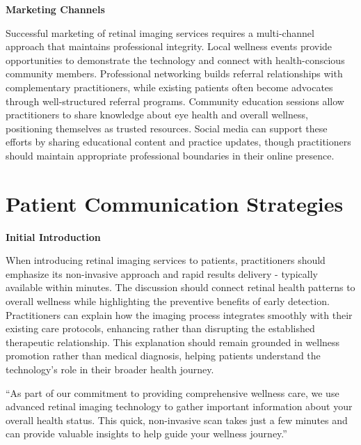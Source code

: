 \documentclass[
  Letterpaper,
]{scrbook}
\begin{document}
\textbf{Marketing Channels}

Successful marketing of retinal imaging services requires a
multi-channel approach that maintains professional integrity. Local
wellness events provide opportunities to demonstrate the technology and
connect with health-conscious community members. Professional networking
builds referral relationships with complementary practitioners, while
existing patients often become advocates through well-structured
referral programs. Community education sessions allow practitioners to
share knowledge about eye health and overall wellness, positioning
themselves as trusted resources. Social media can support these efforts
by sharing educational content and practice updates, though
practitioners should maintain appropriate professional boundaries in
their online presence.

\section{Patient Communication
Strategies}\label{patient-communication-strategies}

\textbf{Initial Introduction}

When introducing retinal imaging services to patients, practitioners
should emphasize its non-invasive approach and rapid results delivery -
typically available within minutes. The discussion should connect
retinal health patterns to overall wellness while highlighting the
preventive benefits of early detection. Practitioners can explain how
the imaging process integrates smoothly with their existing care
protocols, enhancing rather than disrupting the established therapeutic
relationship. This explanation should remain grounded in wellness
promotion rather than medical diagnosis, helping patients understand the
technology's role in their broader health journey.

\begin{tcolorbox}[enhanced jigsaw, colback=white, colframe=quarto-callout-note-color-frame, breakable, titlerule=0mm, opacitybacktitle=0.6, bottomtitle=1mm, coltitle=black, opacityback=0, bottomrule=.15mm, toptitle=1mm, colbacktitle=quarto-callout-note-color!10!white, rightrule=.15mm, leftrule=.75mm, arc=.35mm, title=\textcolor{quarto-callout-note-color}{\faInfo}\hspace{0.5em}{Sample Introduction Script}, toprule=.15mm, left=2mm]

``As part of our commitment to providing comprehensive wellness care, we
use advanced retinal imaging technology to gather important information
about your overall health status. This quick, non-invasive scan takes
just a few minutes and can provide valuable insights to help guide your
wellness journey.''

\end{tcolorbox}
\end{document}
